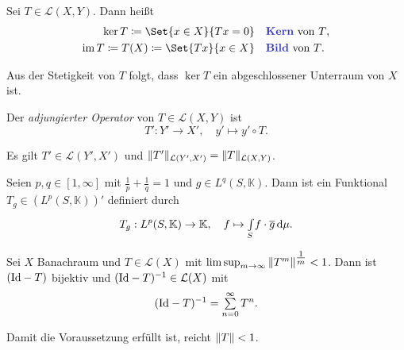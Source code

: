 \documentclass{cheat-sheet}
\newcommand{\K}{\mathbb{K}}
\newcommand{\Leb}{\mathcal{L}} %
\newcommand{\LSO}{\mathcal{L}} %
\begin{document}

\begin{defn}
  Sei $T \in \LSO(X, Y)$. Dann heißt
  \begin{align*}
    \ker T \coloneqq \Set{ x \in X }{ Tx = 0 } \quad &\text{\emph{Kern} von $T$,}\\
    \im T \coloneqq T(X) \coloneqq \Set{ Tx }{ x \in X } \quad &\text{\emph{Bild} von $T$.}
  \end{align*}
\end{defn}

\begin{bem}
  Aus der Stetigkeit von $T$ folgt, dass $\ker T$ ein abgeschlossener Unterraum von $X$ ist.
\end{bem}


\begin{defn}
  Der \emph{adjungierter Operator} von $T \in \LSO(X, Y)$ ist
  \[ T' : Y' \to X', \quad y' \mapsto y' \circ T. \]
\end{defn}

\begin{satz}
  Es gilt $T' \in \Leb(Y', X')$ und $\norm{T'}_{\LSO(Y', X')} = \norm{T}_{\LSO(X, Y)}$.
\end{satz}

\begin{bsp}
  Seien $p, q \in \left[ 1, \infty \right]$ mit $\tfrac{1}{p} + \tfrac{1}{q} = 1$ und $g \in L^q(S, \K)$. Dann ist ein Funktional $T_g \in (L^p(S, \K))'$ definiert durch
  \[ T_g : L^p(S, \K) \to \K, \quad f \mapsto \Int{S}{}{f \cdot \overline{g}}{\mu}. \]
\end{bsp}


\begin{satz}
  Sei $X$ Banachraum und $T \in \LSO(X)$ mit $\limsup_{m \to \infty} \,\lVert T^m\rVert^{\tfrac{1}{m}} < 1$. Dann ist $(\mathrm{Id} - T)$ bijektiv und $(\Id - T)^{-1} \in \LSO(X)$ mit
  \[ (\Id - T)^{-1} = \sum_{n=0}^\infty T^n. \]
\end{satz}

\begin{bem}
  Damit die Voraussetzung erfüllt ist, reicht $\lVert T\rVert < 1$.
\end{bem}
\end{document}
